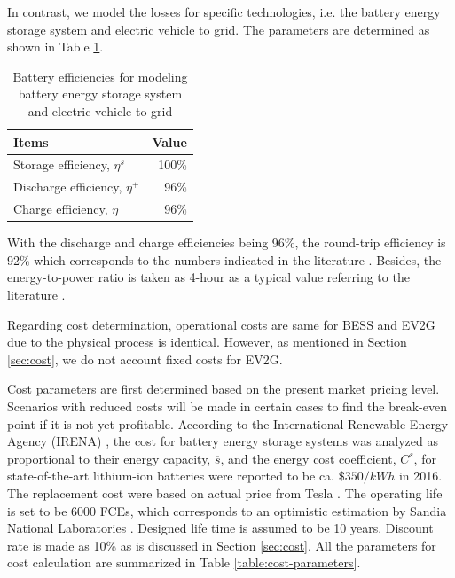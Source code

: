 In contrast, we model the losses for specific technologies, i.e. the battery energy storage system and electric vehicle to grid. The parameters are determined as shown in Table \ref{tab:battery-efficiency}. 

\begin{table}
	\centering
	\begin{tabular}{l r}
		\hline
		\textbf{Items} & \textbf{Value} \\%
		\hline
		Storage efficiency, $\eta^s$ & 100\% \\
		Discharge efficiency, $\eta^+$ & 96\% \\
		Charge efficiency, $\eta^-$ & 96\% \\
		\hline		
	\end{tabular}
	\caption{Battery efficiencies for modeling battery energy storage system and electric vehicle to grid}\label{tab:battery-efficiency}
\end{table}

With the discharge and charge efficiencies being 96\%, the round-trip efficiency is 92\% which corresponds to the numbers indicated in the literature \cite{Akhil2015,Megel2017,IRENA2017}. Besides, the energy-to-power ratio is taken as 4-hour as a typical value referring to the literature \cite{Muller2016,IRENA2017}.

Regarding cost determination, operational costs are same for BESS and EV2G due to the physical process is identical. However, as mentioned in Section \ref{sec:cost}, we do not account fixed costs for EV2G.

Cost parameters are first determined based on the present market pricing level. Scenarios with reduced costs will be made in certain cases to find the break-even point if it is not yet profitable. According to the International Renewable Energy Agency (IRENA) \cite{IRENA2017}, the cost for battery energy storage systems was analyzed as proportional to their energy capacity, $\overline{s}$, and the energy cost coefficient, $C^s$, for state-of-the-art lithium-ion batteries were reported to be ca. $\$350/kWh$ in 2016. The replacement cost were based on actual price from Tesla \cite{Tesla1}. The operating life is set to be 6000 FCEs, which corresponds to an optimistic estimation by Sandia National Laboratories \cite{Akhil2015}. Designed life time is assumed to be 10 years. Discount rate is made as 10\% as is discussed in Section \ref{sec:cost}. All the parameters for cost calculation are summarized in Table \ref{table:cost-parameters}. 


